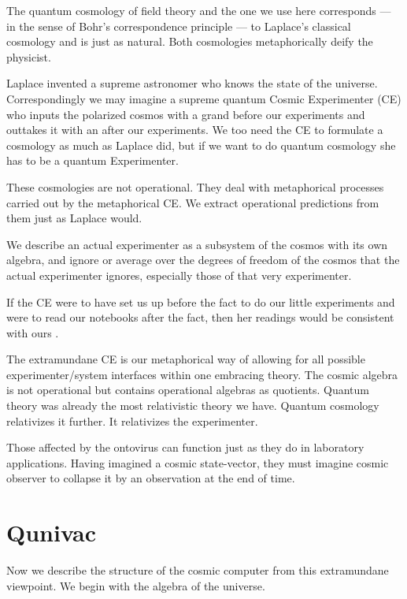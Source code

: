 \documentclass[a4paper,11pt]{article}
\begin{document}
The  quantum cosmology
of field theory
and the one we use here
corresponds 
--- in the sense of Bohr's correspondence principle ---
to
Laplace's classical cosmology
and is just as natural.
Both cosmologies  metaphorically deify the physicist.

Laplace invented a supreme astronomer 
who knows the state of the universe.
Correspondingly
we may imagine a supreme quantum Cosmic Experimenter (CE)
who
inputs the polarized cosmos with a grand \coordHE{} 
before our experiments
and outtakes it with an \coordHE{} after our experiments.
We too need the CE
to formulate a cosmology as much as Laplace did,
but if we want to do quantum cosmology she has to be a quantum 
Experimenter.



These cosmologies are not operational.
They deal with metaphorical processes carried out by 
the metaphorical CE.
We extract  operational predictions
from them just as Laplace would.

We describe an actual experimenter as a subsystem of the cosmos
with its own algebra,
and  ignore or average over
the  degrees of freedom
of the cosmos that the actual experimenter ignores,
especially those of that very experimenter.

If the  CE
 were to have set us up before the fact to
do our little experiments
and were to read our notebooks after the fact,
then her readings would be consistent 
with ours \cite{NEUMANN}.

The extramundane CE
 is our metaphorical way of allowing 
for all possible experimenter/system interfaces
within one embracing theory.
The cosmic algebra is not operational but
contains operational algebras
as quotients.
Quantum theory
was already
the most relativistic theory we have.
Quantum cosmology relativizes it further.
It relativizes the experimenter.

Those affected by the ontovirus can function just as they do 
in laboratory applications.
Having  imagined a cosmic state-vector,
 they must imagine cosmic
observer  to collapse it by an observation at the end of time.

\part{Qunivac}

Now we describe the structure of the cosmic computer
from this extramundane viewpoint.
We begin with the algebra of the universe.
\end{document}
